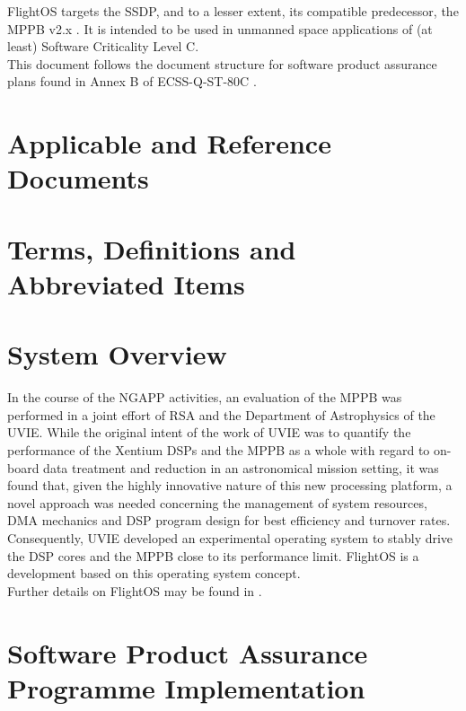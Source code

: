 \noindent
FlightOS targets the \gls{SSDP}, and to a lesser extent, its
compatible predecessor, the \gls{MPPB} v2.x \cite{MPPB}.
It is intended to be used in unmanned space applications of (at least)
Software Criticality Level C. \\

\noindent
This document follows the document structure for software product assurance
plans found in Annex B of ECSS-Q-ST-80C \cite{ECSS80C}.


\chapter{Applicable and Reference Documents} %

\printbibliography[heading=none]


\chapter{Terms, Definitions and Abbreviated Items}
\printglossary[type=acronym]
\printglossary[type=main, style=altlist]


\chapter{System Overview}

In the course of the \gls{NGAPP} activities, an evaluation of the \gls{MPPB}
was performed in a joint effort of \gls{RSA} and the Department of Astrophysics
of the \gls{UVIE}. While the original intent of the work of \gls{UVIE} was to
quantify the performance of the \gls{Xentium} \glspl{DSP} and the \gls{MPPB} as a
whole with regard to on-board data treatment and reduction in an astronomical
mission setting, it was found that, given the highly innovative nature of this new
processing platform, a novel approach was needed concerning the management of
system resources, \gls{DMA} mechanics and \gls{DSP} program design for best
efficiency and turnover rates. Consequently, \gls{UVIE} developed an experimental
operating system to stably drive the \gls{DSP} cores and the \gls{MPPB} close
to its performance limit. FlightOS is a development based on this operating system
concept.\\

\noindent
Further details on FlightOS may be found in \cite{ssdpOS}.


\chapter{Software Product Assurance Programme Implementation}

